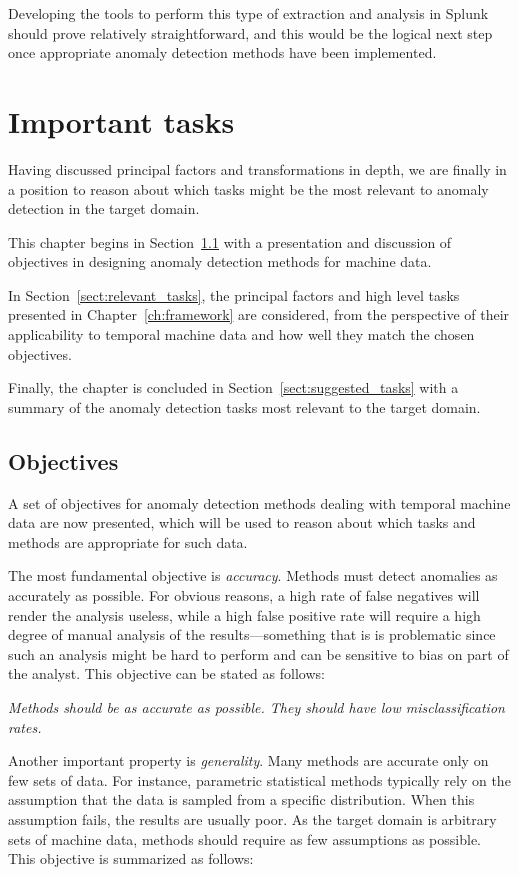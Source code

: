 Developing the tools to perform this type of extraction and analysis in Splunk should prove relatively straightforward, and this would be the logical next step once appropriate anomaly detection methods have been implemented.

\section{Important tasks}
\label{ch:problems}

Having discussed principal factors and transformations in depth, we are finally in a position to reason about which tasks might be the most relevant to anomaly detection in the target domain.

This chapter begins in Section~\ref{sect:goals} with a presentation and discussion of objectives in designing anomaly detection methods for machine data.

In Section~\ref{sect:relevant_tasks}, the principal factors and high level tasks presented in Chapter~\ref{ch:framework} are considered, from the perspective of their applicability to temporal machine data and how well they match the chosen objectives.

Finally, the chapter is concluded in Section~\ref{sect:suggested_tasks} with a summary of the anomaly detection tasks most relevant to the target domain.

\subsection{Objectives}
\label{sect:goals}

A set of objectives for anomaly detection methods dealing with temporal machine data are now presented, which will be used to reason about which tasks and methods are appropriate for such data.

The most fundamental objective is \emph{accuracy}. Methods must detect anomalies as accurately as possible. For obvious reasons, a high rate of false negatives will render the analysis useless, while a high false positive rate will require a high degree of manual analysis of the results---something that is is problematic since such an analysis might be hard to perform and can be sensitive to bias on part of the analyst. This objective can be stated as follows:

  \emph{Methods should be as accurate as possible. They should have low misclassification rates.}

Another important property is \emph{generality}. Many methods are accurate only on few sets of data. For instance, parametric statistical methods typically rely on the assumption that the data is sampled from a specific distribution. When this assumption fails, the results are usually poor. As the target domain is arbitrary sets of machine data, methods should require as few assumptions as possible. This objective is summarized as follows:

